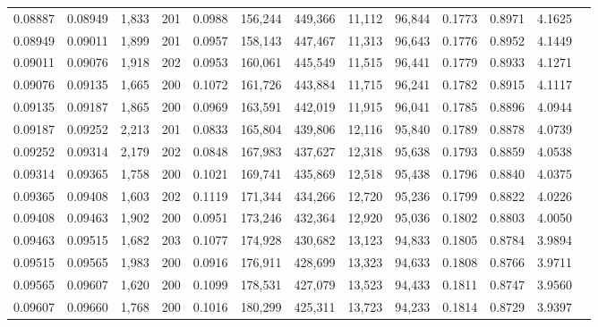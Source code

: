 \begin{tabular}{rrrrrrrrrrrrr}
0.08887 & 0.08949 & 1,833 & 201 &                                     0.0988 & 156,244 & 449,366 &  11,112 &  96,844 & 0.1773 & 0.8971 & 4.1625 \\
0.08949 & 0.09011 & 1,899 & 201 &                                     0.0957 & 158,143 & 447,467 &  11,313 &  96,643 & 0.1776 & 0.8952 & 4.1449 \\
0.09011 & 0.09076 & 1,918 & 202 &                                     0.0953 & 160,061 & 445,549 &  11,515 &  96,441 & 0.1779 & 0.8933 & 4.1271 \\
0.09076 & 0.09135 & 1,665 & 200 &                                     0.1072 & 161,726 & 443,884 &  11,715 &  96,241 & 0.1782 & 0.8915 & 4.1117 \\
0.09135 & 0.09187 & 1,865 & 200 &                                     0.0969 & 163,591 & 442,019 &  11,915 &  96,041 & 0.1785 & 0.8896 & 4.0944 \\
0.09187 & 0.09252 & 2,213 & 201 &                                     0.0833 & 165,804 & 439,806 &  12,116 &  95,840 & 0.1789 & 0.8878 & 4.0739 \\
0.09252 & 0.09314 & 2,179 & 202 &                                     0.0848 & 167,983 & 437,627 &  12,318 &  95,638 & 0.1793 & 0.8859 & 4.0538 \\
0.09314 & 0.09365 & 1,758 & 200 &                                     0.1021 & 169,741 & 435,869 &  12,518 &  95,438 & 0.1796 & 0.8840 & 4.0375 \\
0.09365 & 0.09408 & 1,603 & 202 &                                     0.1119 & 171,344 & 434,266 &  12,720 &  95,236 & 0.1799 & 0.8822 & 4.0226 \\
0.09408 & 0.09463 & 1,902 & 200 &                                     0.0951 & 173,246 & 432,364 &  12,920 &  95,036 & 0.1802 & 0.8803 & 4.0050 \\
0.09463 & 0.09515 & 1,682 & 203 &                                     0.1077 & 174,928 & 430,682 &  13,123 &  94,833 & 0.1805 & 0.8784 & 3.9894 \\
0.09515 & 0.09565 & 1,983 & 200 &                                     0.0916 & 176,911 & 428,699 &  13,323 &  94,633 & 0.1808 & 0.8766 & 3.9711 \\
0.09565 & 0.09607 & 1,620 & 200 &                                     0.1099 & 178,531 & 427,079 &  13,523 &  94,433 & 0.1811 & 0.8747 & 3.9560 \\
0.09607 & 0.09660 & 1,768 & 200 &                                     0.1016 & 180,299 & 425,311 &  13,723 &  94,233 & 0.1814 & 0.8729 & 3.9397 \\

\end{tabular}
